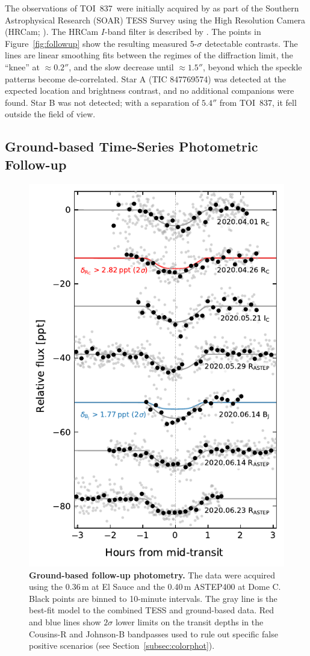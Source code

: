 \documentclass[12pt,twocolumn,tighten]{aastex63}
\newcommand{\tn}{TOI~837} %
\begin{document}
The observations of \tn\ were initially acquired by
\citet{ziegler_soar_2020} as part of the Southern Astrophysical
Research (SOAR) TESS Survey using the High Resolution Camera (HRCam;
\citealt{tokovinin_ten_2018}).  The HRCam $I$-band filter is described
by \citet{tokovinin_ten_2018}.  The points in
Figure~\ref{fig:followup} show the resulting measured 5-$\sigma$
detectable contrasts.  The lines are linear smoothing fits between the
regimes of the diffraction limit, the ``knee'' at $\approx 0.2''$, and
the slow decrease until $\approx 1.5''$, beyond which the speckle
patterns become de-correlated.  Star A (TIC 847769574) was detected at
the expected location and brightness contrast, and no additional
companions were found.  Star B was not detected; with a separation of
$5.4''$ from \tn, it fell outside the field of view.




\subsection{Ground-based Time-Series Photometric Follow-up}
\label{subsec:groundphot}


\begin{figure}[!t]
	\begin{center}
		\leavevmode
		\includegraphics[width=.49\textwidth]{f2b.pdf}
	\end{center}
	\vspace{-0.7cm}
	\caption{
    {\bf Ground-based follow-up photometry.} The data were acquired
    using the 0.36$\,$m at El Sauce and the 0.40$\,$m ASTEP400 at Dome C.
    Black points are binned to 10-minute intervals.  The gray line is
    the best-fit model to the combined TESS and ground-based data.
    Red and blue lines show $2\sigma$ lower limits on the transit depths in the
    Cousins-R and Johnson-B bandpasses used to rule out specific false
    positive scenarios (see Section~\ref{subsec:colorphot}).
		\label{fig:groundphot}
	}
\end{figure}
\end{document}
